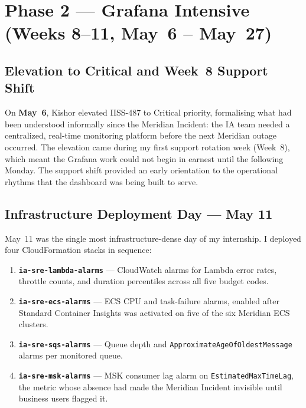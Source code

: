 \section{Phase 2 --- Grafana Intensive (Weeks 8--11, May~6 -- May~27)}
\label{sec:phase2_grafana}

\subsection{Elevation to Critical and Week~8 Support Shift}

On \textbf{May~6}, Kishor elevated IISS-487 to Critical priority, formalising
what had been understood informally since the Meridian Incident: the IA team
needed a centralized, real-time monitoring platform before the next Meridian
outage occurred. The elevation came during my first support rotation week
(Week~8), which meant the Grafana work could not begin in earnest until the
following Monday. The support shift provided an early orientation to the
operational rhythms that the dashboard was being built to serve.

\subsection{Infrastructure Deployment Day --- May 11}

May~11 was the single most infrastructure-dense day of my internship. I deployed four
CloudFormation stacks in sequence:

\begin{enumerate}
    \item \textbf{\texttt{ia-sre-lambda-alarms}} --- CloudWatch alarms for Lambda
          error rates, throttle counts, and duration percentiles across all five
          budget codes.
    \item \textbf{\texttt{ia-sre-ecs-alarms}} --- ECS CPU and task-failure alarms,
          enabled after Standard Container Insights was activated on five of the
          six Meridian ECS clusters.
    \item \textbf{\texttt{ia-sre-sqs-alarms}} --- Queue depth and
          \texttt{ApproximateAgeOfOldestMessage} alarms per monitored queue.
    \item \textbf{\texttt{ia-sre-msk-alarms}} --- MSK consumer lag alarm on
          \texttt{EstimatedMaxTimeLag}, the metric whose absence had made the
          Meridian Incident invisible until business users flagged it.
\end{enumerate}

